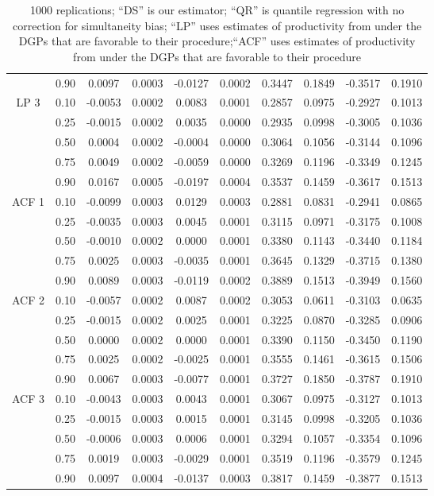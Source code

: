 \documentclass[11pt]{article}
\begin{document}
\begin{table}[H]
\begin{tabular}{cccccccccc}
   & 0.90 & 0.0097 & 0.0003 & -0.0127 & 0.0002 & 0.3447 & 0.1849 & -0.3517 & 0.1910 \\ 
  LP 3 & 0.10 & -0.0053 & 0.0002 & 0.0083 & 0.0001 & 0.2857 & 0.0975 & -0.2927 & 0.1013 \\ 
   & 0.25 & -0.0015 & 0.0002 & 0.0035 & 0.0000 & 0.2935 & 0.0998 & -0.3005 & 0.1036 \\ 
   & 0.50 & 0.0004 & 0.0002 & -0.0004 & 0.0000 & 0.3064 & 0.1056 & -0.3144 & 0.1096 \\ 
   & 0.75 & 0.0049 & 0.0002 & -0.0059 & 0.0000 & 0.3269 & 0.1196 & -0.3349 & 0.1245 \\ 
   & 0.90 & 0.0167 & 0.0005 & -0.0197 & 0.0004 & 0.3537 & 0.1459 & -0.3617 & 0.1513 \\ 
   \hline
ACF 1 & 0.10 & -0.0099 & 0.0003 & 0.0129 & 0.0003 & 0.2881 & 0.0831 & -0.2941 & 0.0865 \\ 
   & 0.25 & -0.0035 & 0.0003 & 0.0045 & 0.0001 & 0.3115 & 0.0971 & -0.3175 & 0.1008 \\ 
   & 0.50 & -0.0010 & 0.0002 & 0.0000 & 0.0001 & 0.3380 & 0.1143 & -0.3440 & 0.1184 \\ 
   & 0.75 & 0.0025 & 0.0003 & -0.0035 & 0.0001 & 0.3645 & 0.1329 & -0.3715 & 0.1380 \\ 
   & 0.90 & 0.0089 & 0.0003 & -0.0119 & 0.0002 & 0.3889 & 0.1513 & -0.3949 & 0.1560 \\ 
  ACF 2 & 0.10 & -0.0057 & 0.0002 & 0.0087 & 0.0002 & 0.3053 & 0.0611 & -0.3103 & 0.0635 \\ 
   & 0.25 & -0.0015 & 0.0002 & 0.0025 & 0.0001 & 0.3225 & 0.0870 & -0.3285 & 0.0906 \\ 
   & 0.50 & 0.0000 & 0.0002 & 0.0000 & 0.0001 & 0.3390 & 0.1150 & -0.3450 & 0.1190 \\ 
   & 0.75 & 0.0025 & 0.0002 & -0.0025 & 0.0001 & 0.3555 & 0.1461 & -0.3615 & 0.1506 \\ 
   & 0.90 & 0.0067 & 0.0003 & -0.0077 & 0.0001 & 0.3727 & 0.1850 & -0.3787 & 0.1910 \\ 
  ACF 3 & 0.10 & -0.0043 & 0.0003 & 0.0043 & 0.0001 & 0.3067 & 0.0975 & -0.3127 & 0.1013 \\ 
   & 0.25 & -0.0015 & 0.0003 & 0.0015 & 0.0001 & 0.3145 & 0.0998 & -0.3205 & 0.1036 \\ 
   & 0.50 & -0.0006 & 0.0003 & 0.0006 & 0.0001 & 0.3294 & 0.1057 & -0.3354 & 0.1096 \\ 
   & 0.75 & 0.0019 & 0.0003 & -0.0029 & 0.0001 & 0.3519 & 0.1196 & -0.3579 & 0.1245 \\ 
   & 0.90 & 0.0097 & 0.0004 & -0.0137 & 0.0003 & 0.3817 & 0.1459 & -0.3877 & 0.1513 \\ 
   \hline
\end{tabular}
\caption*{1000 replications; ``DS'' is our estimator; ``QR'' is quantile regression with no correction for simultaneity bias; ``LP'' uses estimates of productivity from \cite{Levinsohn2003} under the DGPs that are favorable to their procedure;``ACF'' uses estimates of productivity from \cite{Ackerberg2015} under the DGPs that are favorable to their procedure}
\label{simresults}
\end{table}
\pagebreak
\newpage
\end{document}
